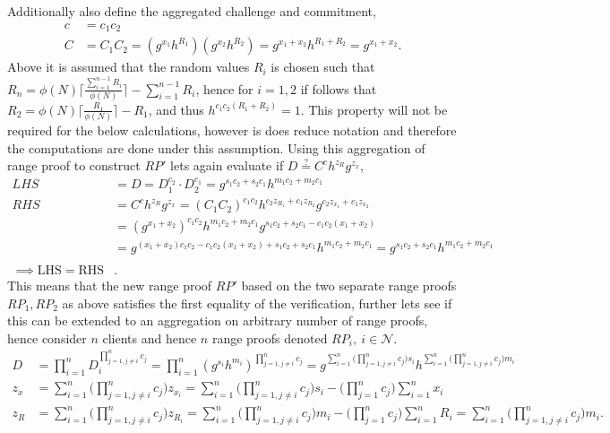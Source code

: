 Additionally also define the aggregated challenge and commitment,
\begin{align*}
c &= c_1c_2 \\
C &= C_1C_2 = (g^{x_1}h^{R_1}) (g^{x_2}h^{R_2}) = g^{x_1+x_2}h^{R_1+R_2}= g^{x_1+x_2}.
\end{align*}
Above it is assumed that the random values $R_i$ is chosen such that $R_n = \phi(N)\lceil \frac{\sum_{i=1}^{n-1}R_i}{\phi(N)}\rceil- \sum_{i=1}^{n-1}R_i $, hence for $i=1,2$ if follows that $R_2 = \phi(N)\lceil \frac{R_1}{\phi(N)}\rceil- R_1$, and thus $h^{c_1c_2(R_1+R_2)} = 1$. This property will not be required for the below calculations, however is does reduce notation and therefore the computations are done under this assumption. 
Using this  aggregation of range proof to construct $RP'$ lets again evaluate if $D\overset{?}{=} C^ch^{z_R}g^{z_x}$,
\begin{align*}
LHS &= D = D_1^{c_2}\cdot D_2^{c_1} =g^{s_1c_2+s_2c_1}h^{m_1c_2+m_2c_1} \\
RHS &= C^ch^{z_R}g^{z_x} = (C_1C_2)^{c_1c_2}h^{c_2z_{R_1}+c_1z_{R_2}}g^{c_2z_{x_1}+c_1z_{x_2}}\\ 
&=(g^{x_1 + x_2})^{c_1c_2} h^{m_1c_2 +m_2c_1} g^{s_1c_2+ s_2c_1- c_1c_2(x_1+x_2)}  \\
&= g^{(x_1+x_2)c_1c_2 - c_1c_2(x_1+x_2) +s_1c_2+s_2c_1} h^{m_1c_2 +m_2c_1} = g^{s_1c_2+s_2c_1} h^{m_1c_2 +m_2c_1} \\
\\ \implies \text{LHS} =\text{RHS}&.
\end{align*}
This means that the new range proof $RP'$ based on the two separate range proofs $RP_1,RP_2$ as above satisfies the first equality of the verification, further lets see if this can be extended to an aggregation on arbitrary number of range proofs, hence consider $n$ clients and hence $n$ range proofs denoted $RP_i,\: i\in\mathcal{N}$. 
\begin{equation}
\begin{aligned}
\label{eq:aggDn}
D &=\prod_{i=1}^n  D_i ^{\prod_{j=1, j\neq i}^n  c_j }  =  \prod_{i=1}^n  (g^{s_i}h^{m_i}) ^{\prod_{j=1, j\neq i}^n  c_j } = g ^ {\sum_{i=1}^n \Big(\prod_{j=1, j\neq i}^n   c_j \Big)s_i} h^ {\sum_{i=1}^n \Big(\prod_{j=1, j\neq i}^n   c_j \Big)m_i}\\
z_x &= \sum_{i=1}^n \Big( \prod_{j=1,j\neq i}^n c_j \Big) z_{x_i} = \sum_{i=1}^n \Big( \prod_{j=1, j\neq i}^n c_j \Big)s_i - \big( \prod_{j=1}^n c_j \Big) \sum_{i=1}^n x_i\\
z_R &=  \sum_{i=1}^n \Big( \prod_{j=1,j\neq i}^n c_j \Big) z_{R_i} = \sum_{i=1}^n \Big( \prod_{j=1, j\neq i}^n c_j \Big)m_i - \big( \prod_{j=1}^n c_j \Big) \sum_{i=1}^n R_i = \sum_{i=1}^n \Big( \prod_{j=1, j\neq i}^n c_j \Big)m_i.
\end{aligned}
\end{equation}
